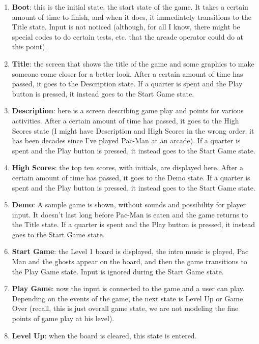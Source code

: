 \begin{enumerate}
\def\labelenumi{\arabic{enumi}.}
\tightlist
\item
  \textbf{Boot}: this is the initial state, the start state of the game.
  It takes a certain amount of time to finish, and when it does, it
  immediately transitions to the Title state. Input is not noticed
  (although, for all I know, there might be special codes to do certain
  tests, etc. that the arcade operator could do at this point).
\item
  \textbf{Title}: the screen that shows the title of the game and some
  graphics to make someone come closer for a better look. After a
  certain amount of time has passed, it goes to the Description state.
  If a quarter is spent and the Play button is pressed, it instead goes
  to the Start Game state.
\item
  \textbf{Description}: here is a screen describing game play and points
  for various activities. After a certain amount of time has passed, it
  goes to the High Scores state (I might have Description and High
  Scores in the wrong order; it has been decades since I've played
  Pac-Man at an arcade). If a quarter is spent and the Play button is
  pressed, it instead goes to the Start Game state.
\item
  \textbf{High Scores}: the top ten scores, with initials, are displayed
  here. After a certain amount of time has passed, it goes to the Demo
  state. If a quarter is spent and the Play button is pressed, it
  instead goes to the Start Game state.
\item
  \textbf{Demo}: A sample game is shown, without sounds and possibility
  for player input. It doesn't last long before Pac-Man is eaten and the
  game returns to the Title state. If a quarter is spent and the Play
  button is pressed, it instead goes to the Start Game state.
\item
  \textbf{Start Game}: the Level 1 board is displayed, the intro music
  is played, Pac Man and the ghosts appear on the board, and then the
  game transitions to the Play Game state. Input is ignored during the
  Start Game state.
\item
  \textbf{Play Game}: now the input is connected to the game and a user
  can play. Depending on the events of the game, the next state is Level
  Up or Game Over (recall, this is just overall game state, we are not
  modeling the fine points of game play at his level).
\item
  \textbf{Level Up}: when the board is cleared, this state is entered.

\end{enumerate}
